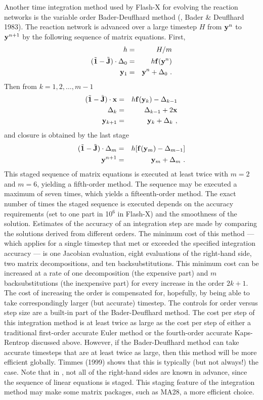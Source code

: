 Another time integration method used by Flash-X for evolving the reaction
networks is the variable order Bader-Deuflhard method (\eg, Bader \&
Deuflhard 1983).  The reaction network is advanced
over a large timestep $H$ from ${\bf y}^n$ to ${\bf y}^{n+1}$ by the
following sequence of matrix equations. First,
\begin{eqnarray}
\nonumber
h & = & H/m \\
\label{Eqn:BD 1}
(\tilde{{\bf 1}} - \tilde{{\bf J}}) \cdot \Delta_0 & = & h {\bf f}
({\bf y}^n) \\
\nonumber
{\bf y}_1 & = &{\bf y}^n + \Delta_0\ .
\end{eqnarray}
Then from $k=1,2,\ldots,m-1$
\begin{eqnarray}
\nonumber
(\tilde{{\bf 1}} - \tilde{{\bf J}}) \cdot {\bf x} & = &
h {\bf f}({\bf y}_{k}) - \Delta_{k-1}  \\
\Delta_k & = & \Delta_{k-1} + 2 {\bf x} \\
\nonumber
{\bf y}_{k+1} & = &{\bf y}_k + \Delta_k \ ,
\end{eqnarray}
and closure is obtained by the last stage
\begin{eqnarray}
\nonumber
(\tilde{{\bf 1}} - \tilde{{\bf J}}) \cdot \Delta_m & = &
h [ {\bf f} ({\bf y}_m)  - \Delta_{m-1} ] \\
\label{Eqn:BD 3}
{\bf y}^{n+1} & = &{\bf y}_m + \Delta_m \ .
\end{eqnarray}
This staged sequence of matrix equations is executed at least twice
with $m=2$ and $m=6$, yielding a fifth-order method.  The sequence
may be executed a maximum of seven times, which yields a
fifteenth-order method.  The exact number of times the staged
sequence is executed depends on the accuracy requirements (set to
one part in 10$^6$ in Flash-X) and the smoothness of the solution.
Estimates of the accuracy of an integration step are made by
comparing the solutions derived from different orders.  The minimum
cost of this method --- which applies for a single timestep that met
or exceeded the specified integration accuracy --- is one Jacobian
evaluation, eight evaluations of the right-hand side, two matrix
decompositions, and ten backsubstitutions.  This minimum cost can be
increased at a rate of one decomposition (the expensive part) and
$m$ backsubstitutions (the inexpensive part) for every increase in
the order $2k+1$. The cost of increasing the order is compensated
for, hopefully, by being able to take correspondingly larger (but
accurate) timestep.  The controls for order versus step size are a
built-in part of the Bader-Deuflhard method.  The cost per step of
this integration method is at least twice as large as the cost per
step of either a traditional first-order accurate Euler method or
the fourth-order accurate Kaps-Rentrop discussed above. However, if
the Bader-Deuflhard method can take accurate timesteps that are at
least twice as large, then this method will be more efficient
globally. Timmes (1999) shows that this is typically (but not
always!) the case. Note that in , not
all of the right-hand sides are known in advance, since the sequence
of linear equations is staged. This staging feature of the
integration method may make some matrix packages, such as MA28, a
more efficient choice.



